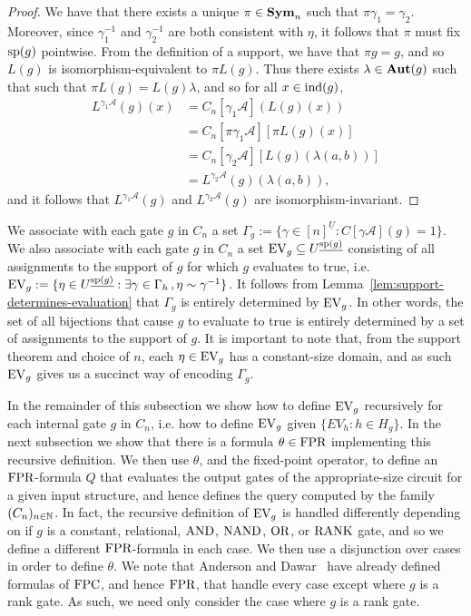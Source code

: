 \documentclass[../paper.tex]{subfiles}
\begin{document}
\begin{proof}
	We have that there exists a unique $\pi \in \text{\textbf{Sym}}_n$ such that $\pi \gamma_1 =
  \gamma_2$. Moreover, since $\gamma^{-1}_1$ and $\gamma^{-1}_2$ are both
  consistent with $\eta$, it follows that $\pi$ must fix $\text{sp}(g)$ pointwise.
  From the definition of a support, we have that $\pi g = g$, and so $L(g)$ is
  isomorphism-equivalent to $\pi L(g)$. Thus there exists $\lambda \in \text{\textbf{Aut}}(g)$
  such that such that $\pi L(g) = L(g) \lambda$, and so for all $x \in \text{\upshape ind}(g)$,
	\begin{align*}
		L^{\gamma_1 \mathcal{A}}(g) (x) & = C_n[\gamma_1 \mathcal{A}](L(g)(x))                    \\
                                    & = C_n[\pi \gamma_1 \mathcal{A}][\pi L(g)(x)]            \\
                                    & = C_n[\gamma_2 \mathcal{A}][L(g)(\lambda(a,b))] \\
                                    & = L^{\gamma_2 \mathcal{A}}(g) (\lambda (a,b)),                 
	\end{align*}
	and it follows that $L^{\gamma_1 \mathcal{A}}(g)$ and $L^{\gamma_2
    \mathcal{A}}(g)$ are isomorphism-invariant.
\end{proof}

We associate with each gate $g$ in $C_n$ a set $\Gamma_g:= \{\gamma \in
[n]^{\underline{U}} : C[\gamma \mathcal{A}](g) = 1 \}$. We also associate with
each gate $g$ in $C_n$ a set $\text{EV}_g \subseteq U^{\underline{\text{sp}(g)}}$
consisting of all assignments to the support of $g$ for which $g$ evaluates to
true, i.e. $\text{EV}_g := \{ \eta \in U^{\underline{\text{sp}(g)}} : \exists \gamma \in
\Gamma_h \, ,\eta \sim \gamma^{-1}\}$. It follows from
Lemma~\ref{lem:support-determines-evaluation} that $\Gamma_g$ is entirely
determined by $\text{EV}_g$. In other words, the set of all bijections that cause $g$
to evaluate to true is entirely determined by a set of assignments to the
support of $g$. It is important to note that, from the support theorem and
choice of $n$, each $\eta \in \text{EV}_g$ has a constant-size domain, and as such
$\text{EV}_g$ gives us a succinct way of encoding $\Gamma_g$.

In the remainder of this subsection we show how to define $\text{EV}_g$ recursively
for each internal gate $g$ in $C_n$, i.e. how to define $\text{EV}_g$ given $\{EV_h :
h \in H_g \}$. In the next subsection we show that there is a formula $\theta
\in \text{\upshape FPR}$ implementing this recursive definition. We then use $\theta$, and the
fixed-point operator, to define an $\text{\upshape FPR}$-formula $Q$ that evaluates the output
gates of the appropriate-size circuit for a given input structure, and hence
defines the query computed by the family $(C_n)_{n \in \mathbb{N}}$. In fact, the
recursive definition of $\text{EV}_g$ is handled differently depending on if $g$ is a
constant, relational, $\text{\upshape AND}$, $\text{\upshape NAND}$, $\text{\upshape OR}$, or $\text{\upshape RANK}$ gate, and so we define
a different $\text{\upshape FPR}$-formula in each case. We then use a disjunction over cases in
order to define $\theta$. We note that Anderson and Dawar~\cite{AndersonD17}
have already defined formulas of $\text{\upshape FPC}$, and hence $\text{\upshape FPR}$, that handle every
case except where $g$ is a rank gate. As such, we need only consider the case
where $g$ is a rank gate.
\end{document}
